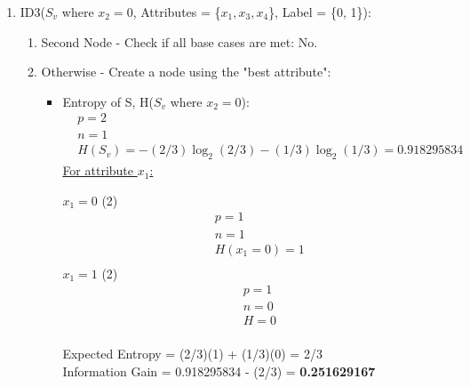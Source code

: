 \documentclass[8pt, fullpage,letterpaper]{article}
\begin{document}
\begin{enumerate}
\begin{enumerate}
\begin{enumerate}
	 	\item ID3($S_v$ where $x_2 = 0$, Attributes = \{$x_1, x_3, x_4$\}, Label = \{0, 1\}): 
			\begin{enumerate}
			\item Second Node - Check if all base cases are met:{\color{red} No}.
			\item Otherwise - Create a node using the "best attribute":
				\begin{itemize}
					\item Entropy of S, H($S_v$ where $x_2 = 0$):
						\begin{align*}
						    	& p = 2\\
							& n = 1 \\
						    	& H(S_v) = - (2/3) \log_2 (2/3) - (1/3) \log_2 (1/3) = 0.918295834
					      \end{align*}
						\underline {For attribute $x_1$:} 
							\vspace{-5pt}
							\begin{multicols}{2}
								$x_1=0$ (2)
			 						\begin{align*}
									    	& p = 1\\
										& n = 1 \\
									    	& H(x_1 = 0) = 1\\
								      \end{align*}
								$x_1=1$ (2)
			 						\begin{align*}
									    	& p = 1\\
										& n = 0 \\
									    	& H = 0\\
								      \end{align*}
							\end{multicols}
							\vspace{-20pt}
							Expected Entropy = (2/3)(1) + (1/3)(0) = 2/3\\
							Information Gain = 0.918295834 - (2/3) = {\bf 0.251629167}\\


\end{itemize}
\end{enumerate}
\end{enumerate}
\end{enumerate}
\end{enumerate}
\end{document}
